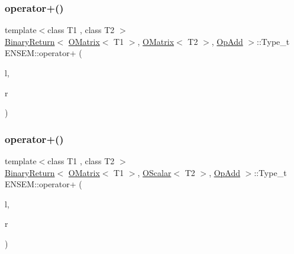 \mbox{\label{group__obsmatrix_ga0ad42a3395997cd3a2d836e981969fe2}} 
\subsubsection{\texorpdfstring{operator+()}{operator+()}\hspace{0.1cm}{\footnotesize\ttfamily [2/4]}}
{\footnotesize\ttfamily template$<$class T1 , class T2 $>$ \\
\mbox{\hyperlink{structENSEM_1_1BinaryReturn}{Binary\+Return}}$<$ \mbox{\hyperlink{classENSEM_1_1OMatrix}{O\+Matrix}}$<$ T1 $>$, \mbox{\hyperlink{classENSEM_1_1OMatrix}{O\+Matrix}}$<$ T2 $>$, \mbox{\hyperlink{structENSEM_1_1OpAdd}{Op\+Add}} $>$\+::Type\+\_\+t E\+N\+S\+E\+M\+::operator+ (\begin{DoxyParamCaption}\item[{const \mbox{\hyperlink{classENSEM_1_1OMatrix}{O\+Matrix}}$<$ T1 $>$ \&}]{l,  }\item[{const \mbox{\hyperlink{classENSEM_1_1OMatrix}{O\+Matrix}}$<$ T2 $>$ \&}]{r }\end{DoxyParamCaption})\hspace{0.3cm}{\ttfamily [inline]}}

\mbox{\label{group__obsmatrix_ga594575d5bb0ce31fd07e9fb29fd9c8ac}} 
\subsubsection{\texorpdfstring{operator+()}{operator+()}\hspace{0.1cm}{\footnotesize\ttfamily [3/4]}}
{\footnotesize\ttfamily template$<$class T1 , class T2 $>$ \\
\mbox{\hyperlink{structENSEM_1_1BinaryReturn}{Binary\+Return}}$<$ \mbox{\hyperlink{classENSEM_1_1OMatrix}{O\+Matrix}}$<$ T1 $>$, \mbox{\hyperlink{classENSEM_1_1OScalar}{O\+Scalar}}$<$ T2 $>$, \mbox{\hyperlink{structENSEM_1_1OpAdd}{Op\+Add}} $>$\+::Type\+\_\+t E\+N\+S\+E\+M\+::operator+ (\begin{DoxyParamCaption}\item[{const \mbox{\hyperlink{classENSEM_1_1OMatrix}{O\+Matrix}}$<$ T1 $>$ \&}]{l,  }\item[{const \mbox{\hyperlink{classENSEM_1_1OScalar}{O\+Scalar}}$<$ T2 $>$ \&}]{r }\end{DoxyParamCaption})\hspace{0.3cm}{\ttfamily [inline]}}

